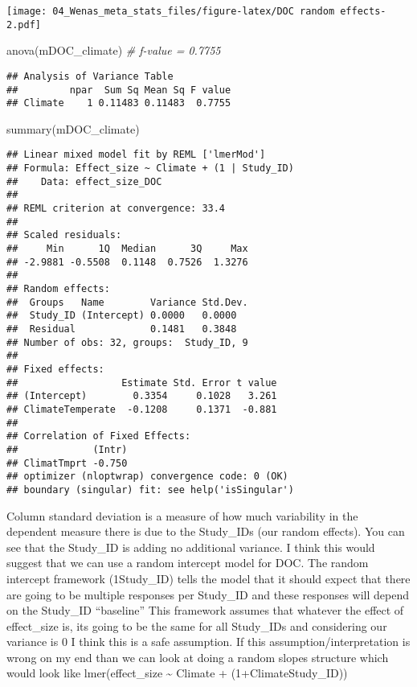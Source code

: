 \documentclass[
]{article}
\newenvironment{Shaded}{\begin{snugshade}}{\end{snugshade}}
\newcommand{\CommentTok}[1]{\textcolor[rgb]{0.56,0.35,0.01}{\textit{#1}}}
\newcommand{\FunctionTok}[1]{\textcolor[rgb]{0.00,0.00,0.00}{#1}}
\newcommand{\NormalTok}[1]{#1}
\begin{document}
\texttt{[image: 04\_Wenas\_meta\_stats\_files/figure-latex/DOC random effects-2.pdf]}

\begin{Shaded}
\begin{Highlighting}[]
\FunctionTok{anova}\NormalTok{(mDOC\_climate) }\CommentTok{\# f{-}value = 0.7755}
\end{Highlighting}
\end{Shaded}

\begin{verbatim}
## Analysis of Variance Table
##         npar  Sum Sq Mean Sq F value
## Climate    1 0.11483 0.11483  0.7755
\end{verbatim}

\begin{Shaded}
\begin{Highlighting}[]
\FunctionTok{summary}\NormalTok{(mDOC\_climate) }
\end{Highlighting}
\end{Shaded}

\begin{verbatim}
## Linear mixed model fit by REML ['lmerMod']
## Formula: Effect_size ~ Climate + (1 | Study_ID)
##    Data: effect_size_DOC
## 
## REML criterion at convergence: 33.4
## 
## Scaled residuals: 
##     Min      1Q  Median      3Q     Max 
## -2.9881 -0.5508  0.1148  0.7526  1.3276 
## 
## Random effects:
##  Groups   Name        Variance Std.Dev.
##  Study_ID (Intercept) 0.0000   0.0000  
##  Residual             0.1481   0.3848  
## Number of obs: 32, groups:  Study_ID, 9
## 
## Fixed effects:
##                  Estimate Std. Error t value
## (Intercept)        0.3354     0.1028   3.261
## ClimateTemperate  -0.1208     0.1371  -0.881
## 
## Correlation of Fixed Effects:
##             (Intr)
## ClimatTmprt -0.750
## optimizer (nloptwrap) convergence code: 0 (OK)
## boundary (singular) fit: see help('isSingular')
\end{verbatim}

Column standard deviation is a measure of how much variability in the
dependent measure there is due to the Study\_IDs (our random effects).
You can see that the Study\_ID is adding no additional variance. I think
this would suggest that we can use a random intercept model for DOC. The
random intercept framework (1\textbar Study\_ID) tells the model that it
should expect that there are going to be multiple responses per
Study\_ID and these responses will depend on the Study\_ID ``baseline''
This framework assumes that whatever the effect of effect\_size is, its
going to be the same for all Study\_IDs and considering our variance is
0 I think this is a safe assumption. If this assumption/interpretation
is wrong on my end than we can look at doing a random slopes structure
which would look like lmer(effect\_size \textasciitilde{} Climate +
(1+Climate\textbar Study\_ID))
\end{document}
